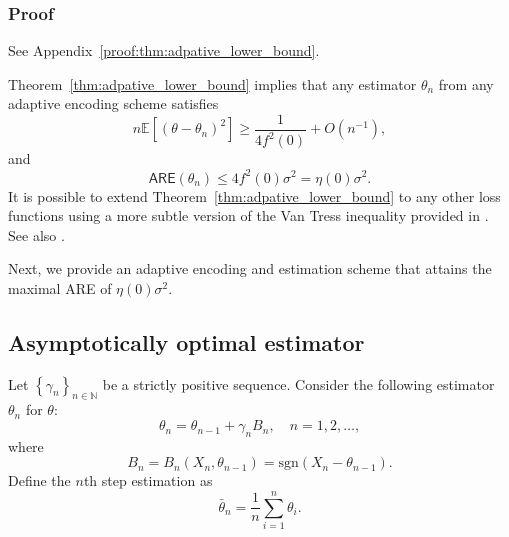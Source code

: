 \documentclass[letterpaper, 11pt]{IEEEtran}      %
\newcommand{\ARE}{\mathsf{ARE}}
\newcommand{\sgn}{\mathrm{sgn} }
\begin{document}
\subsubsection*{Proof}
See Appendix~\ref{proof:thm:adpative_lower_bound}.\par

Theorem~\ref{thm:adpative_lower_bound} implies that any estimator ${\theta}_n$ from any adaptive encoding scheme satisfies
\[
n\mathbb E\left[ (\theta-\theta_n)^2 \right] \geq  \frac{1}{4f^2(0)}+O(n^{-1}),
\]
and 
\[
\ARE({\theta}_n) \leq 4f^2(0)\sigma^2 = \eta(0)\sigma^2.
\]
It is possible to extend Theorem~\ref{thm:adpative_lower_bound} to any other loss functions using a more subtle version of the Van Tress inequality provided in \cite{efroimovich1980information}. See also \cite{DBLP:journals/corr/abs-1902-08582}. \par
%
Next, we provide an adaptive encoding and estimation scheme that attains the maximal ARE of $\eta(0)\sigma^2$. 

\subsection{Asymptotically optimal estimator}
Let $\left\{ \gamma_n \right\}_{n\in \mathbb N}$ be a strictly positive sequence. Consider the following estimator ${\theta}_n$ for $\theta$:  
\begin{equation}
\label{eq:sgd_alg}
\theta_n = \theta_{n-1} +  \gamma_n B_n, \quad n = 1,2,\ldots,
\end{equation}
where 
\begin{equation}
B_n = B_n (X_n,\theta_{n-1}) =\sgn (X_n - \theta_{n-1}).
\end{equation}
Define the $n$th step estimation as
\begin{equation} \label{eq:sgd_est}
\bar{\theta}_n =  \frac{1}{n} \sum_{i=1}^n  \theta_i. 
\end{equation}
\end{document}
